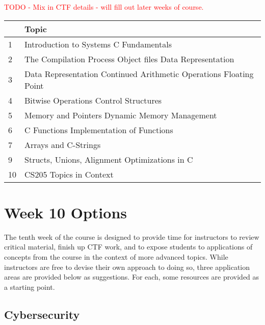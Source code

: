 \documentclass[12pt,letterpaper]{article}
\begin{document}
	\textcolor{red}{TODO - Mix in CTF details - will fill out later weeks of course.}

	\begin{longtable}{| p{0.5in} | p{6in} |} \hline
		\rowcolor{lightgray}{\bf Wk} & {\bf Topic} \\ \hline \endhead
		
		1 & Introduction to Systems \newline C Fundamentals  \\ \hline
		2 & The Compilation Process \newline Object files \newline Data Representation  \\ \hline
		3 & Data Representation Continued  \newline  Arithmetic Operations  \newline Floating Point \\ \hline
		4 & Bitwise Operations \newline  Control Structures  \\ \hline
		5 & Memory and Pointers  \newline  Dynamic Memory Management \\ \hline
		6 & C Functions \newline  Implementation of Functions  \\ \hline
		7 & Arrays and C-Strings \\ \hline
		9 & Structs, Unions, Alignment  \newline Optimizations in C  \\ \hline
		10 & CS205 Topics in Context  \\ \hline
	\end{longtable}

	\clearpage
	\section{Week 10 Options}

	The tenth week of the course is designed to provide time for instructors to review critical material, finish up CTF work, and to expose students to applications of concepts from the course in the context of more advanced topics. While instructors are free to devise their own approach to doing so, three application areas are provided below as suggestions. For each, some resources are provided as a starting point.


	\subsection{Cybersecurity}
\end{document}
